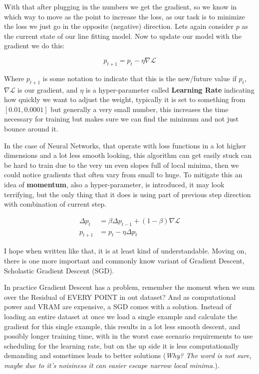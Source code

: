 \documentclass{article}
\begin{document}
    With that after plugging in the numbers we get the gradient, so we know in which way to move as the point to increase the loss, as our task is to minimize the loss we just go in the opposite (negative) direction.
    Lets again consider $p$ as the current state of our line fitting model.
    Now to update our model with the gradient we do this:

    \begin{equation}
        p_{t+1} = p_t - \eta\nabla\mathcal L
    \end{equation}

    Where $p_{t+1}$ is some notation to indicate that this is the new/future value if $p_t$, $\nabla\mathcal L$ is our gradient, and $\eta$ is a hyper-parameter called \textbf{Learning Rate} indicating how quickly we want to adjust the weight, typically it is set to something from $\left[0.01, 0.0001\right]$ but generally a very small number, this increases the time necessary for training but makes sure we can find the minimum and not just bounce around it.

    In the case of Neural Networks, that operate with loss functions in a lot higher dimensions and a lot less smooth looking, this algorithm can get easily stuck can be hard to train due to the very un even slopes full of local minima, then we could notice gradients that often vary from small to huge.
    To mitigate this an idea of \textbf{momentum}, also a hyper-parameter, is introduced, it may look terrifying, but the only thing that it does is using part of previous step direction with combination of current step.

    \begin{align*}
        \Delta p_t &= \beta \Delta p_{t-1} + (1-\beta)\nabla\mathcal L\\
        p_{t+1} &= p_t - \eta\Delta p_t
    \end{align*}

    I hope when written like that, it is at least kind of understandable.
    Moving on, there is one more important and commonly know variant of Gradient Descent, Scholastic Gradient Descent (SGD).

    In practice Gradient Descent has a problem, remember the moment when we sum over the Residual of EVERY POINT in out dataset?
    And as computational power and VRAM are expensive, a SGD comes with a solution.
    Instead of loading an entire dataset at once we load a single example and calculate the gradient for this single example, this results in a lot less smooth descent, and possibly longer training time, with in the worst case scenario requirements to use scheduling for the learning rate, but on the up side it is less computationally demanding and sometimes leads to better solutions (\textit{Why? The word is not sure, maybe due to it's noisiness it can easier escape narrow local minima.}).
\end{document}
